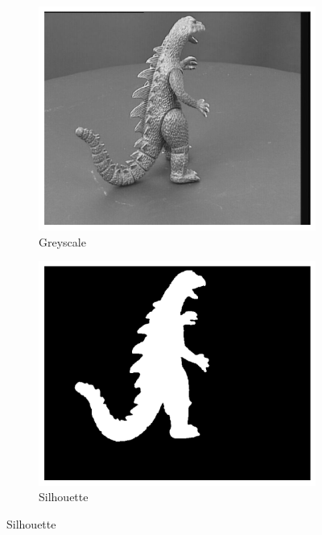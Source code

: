 \begin{figure}[ht]
  \centering
  \begin{subfigure}[b]{0.25\textwidth}
    \centering
    \includegraphics[width=\textwidth]{images/q2_masked_img_4.png}
    \caption{Greyscale}
  \end{subfigure}
  \hspace{1em}
  \begin{subfigure}[b]{0.25\textwidth}
    \centering
    \includegraphics[width=\textwidth]{images/q2_masked_img_3.png}
    \caption{Silhouette}
  \end{subfigure}

\end{figure}
